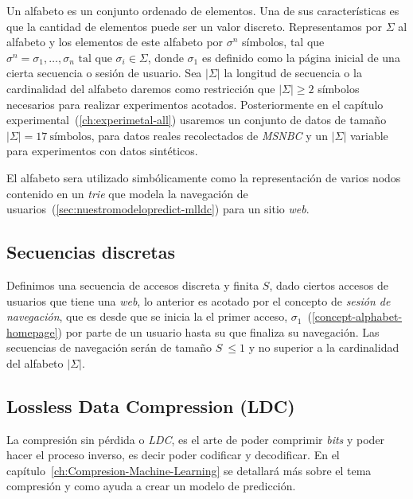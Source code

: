 Un alfabeto es un conjunto ordenado de elementos. Una de sus características es que la cantidad de elementos puede ser un valor discreto. Representamos por $\Sigma$ al alfabeto y los elementos de este  alfabeto por $\sigma^{n}$ símbolos, tal que $\sigma^{n}= \sigma_{1}, \dots, \sigma_{n} \mbox{ tal que } \sigma_{i} \in \Sigma$, donde {$\sigma_{1}$}\label{concept-alphabet-homepage} es definido como la página inicial de una cierta secuencia  o sesión de usuario. Sea $|\Sigma|$ la longitud de secuencia o la cardinalidad del alfabeto daremos como restricción que $|\Sigma| \geq 2$ símbolos~\cite{Dmitry2002} necesarios para realizar experimentos acotados. Posteriormente en el capítulo experimental~(\ref{ch:experimetal-all}) usaremos un conjunto de datos de tamaño $|\Sigma| = 17\  \mbox{símbolos}$, para datos reales recolectados de \emph{MSNBC}\cite{Claude2014} y un $|\Sigma|$ variable para experimentos con datos sintéticos.

El alfabeto sera utilizado simbólicamente como la representación de varios nodos contenido en un \emph{trie} que {modela la navegación de usuarios}~(\ref{sec:nuestromodelopredict-mlldc}) para un sitio \emph{web}.





\subsection{Secuencias discretas}\label{concept-discret-seq}

Definimos una secuencia de accesos discreta y finita  $S$, dado ciertos accesos de usuarios que tiene una \emph{web}, lo anterior es acotado por el concepto de \emph{sesión de navegación}, que es desde que se inicia la el primer acceso, $\sigma_{1}$~(\ref{concept-alphabet-homepage}) por parte de un usuario hasta su que finaliza su navegación. Las secuencias de navegación serán de tamaño $S\ \leq 1$ y  no superior a la cardinalidad del alfabeto $|\Sigma|$.



\subsection{Lossless Data Compression (LDC)} \label{concept-LDC}

La compresión sin pérdida o \emph{LDC}, es el arte de poder comprimir \emph{bits} y poder hacer el proceso inverso, es decir poder codificar y decodificar. En el capítulo~\ref{ch:Compresion-Machine-Learning} se detallará más sobre el tema compresión y como ayuda a crear un modelo de predicción.



